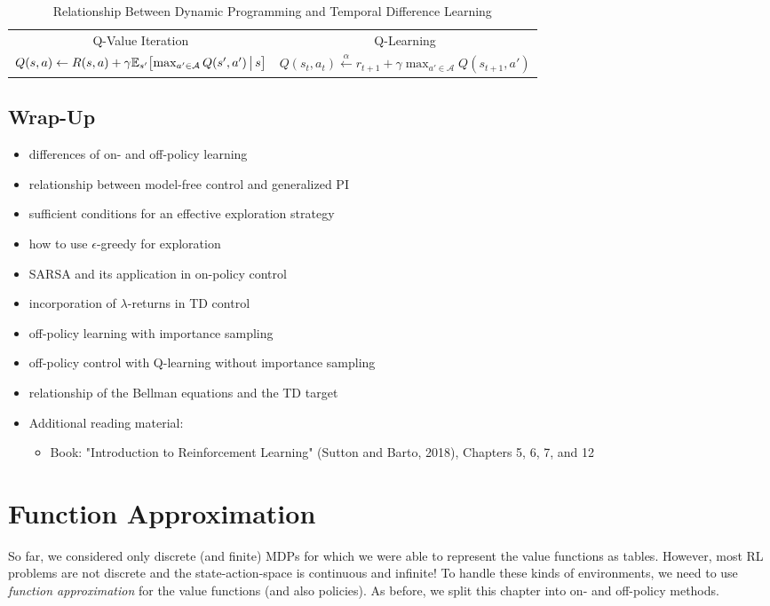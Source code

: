 \begin{table}
\begin{tabular}{c|c}
				                                            Q-Value Iteration                                             &                                               Q-Learning                                                \\
				\( Q(s, a) \gets R(s, a) + \gamma \mathbb{E}_{s'}\bigl[ \max_{a' \in \mathcal{A}} Q(s', a') \,\big\vert\, s \bigr] \) & \( Q(s_t, a_t) \overset{\alpha}{\gets} r_{t + 1} + \gamma \max_{a' \in \mathcal{A}} Q(s_{t + 1}, a') \) \\ \bottomrule
			\end{tabular}
			\caption{Relationship Between Dynamic Programming and Temporal Difference Learning}
			\label{fig:dpTdRelationship}
		\end{table}

	\section{Wrap-Up}
		\begin{itemize}
			\item differences of on- and off-policy learning
			\item relationship between model-free control and generalized \ac{PI}
			\item sufficient conditions for an effective exploration strategy
			\item how to use \(\epsilon\)-greedy for exploration
			\item \ac{SARSA} and its application in on-policy control
			\item incorporation of \(\lambda\)-returns in \ac{TD} control
			\item off-policy learning with importance sampling
			\item off-policy control with Q-learning without importance sampling
			\item relationship of the Bellman equations and the \ac{TD} target
			\item Additional reading material:
				\begin{itemize}
					\item Book: "Introduction to Reinforcement Learning" (Sutton and Barto, 2018), Chapters 5, 6, 7, and 12  %
				\end{itemize}
		\end{itemize}

\chapter{Function Approximation}
	So far, we considered only discrete (and finite) \acp{MDP} for which we were able to represent the value functions as tables. However, most \ac{RL} problems are not discrete and the state-action-space is continuous and infinite! To handle these kinds of environments, we need to use \emph{function approximation} for the value functions (and also policies). As before, we split this chapter into on- and off-policy methods.

